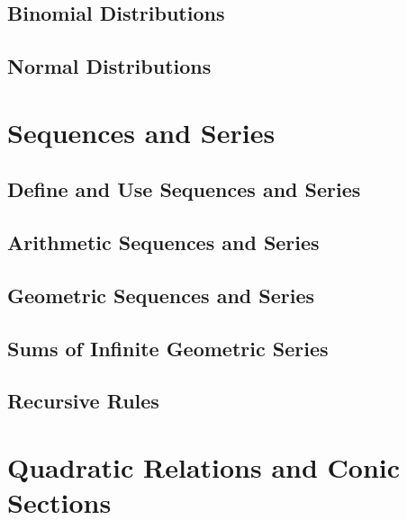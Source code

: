 \documentclass[]{book}
\begin{document}
\hypertarget{binomial-distributions}{%
\section{Binomial Distributions}\label{binomial-distributions}}

\hypertarget{normal-distributions}{%
\section{Normal Distributions}\label{normal-distributions}}

\hypertarget{sequences-and-series}{%
\chapter{Sequences and Series}\label{sequences-and-series}}

\hypertarget{define-and-use-sequences-and-series}{%
\section{Define and Use Sequences and Series}\label{define-and-use-sequences-and-series}}

\hypertarget{arithmetic-sequences-and-series}{%
\section{Arithmetic Sequences and Series}\label{arithmetic-sequences-and-series}}

\hypertarget{geometric-sequences-and-series}{%
\section{Geometric Sequences and Series}\label{geometric-sequences-and-series}}

\hypertarget{sums-of-infinite-geometric-series}{%
\section{Sums of Infinite Geometric Series}\label{sums-of-infinite-geometric-series}}

\hypertarget{recursive-rules}{%
\section{Recursive Rules}\label{recursive-rules}}

\hypertarget{quadratic-relations-and-conic-sections}{%
\chapter{Quadratic Relations and Conic Sections}\label{quadratic-relations-and-conic-sections}}
\end{document}
